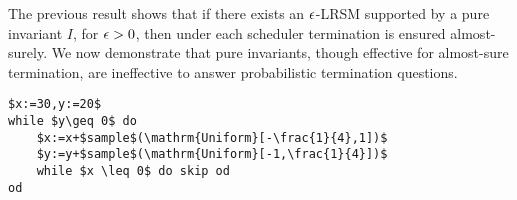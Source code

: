 The previous result shows that if there exists  an $\epsilon$-LRSM 
supported by a pure invariant $I$, for $\epsilon>0$, then under each scheduler 
termination is ensured almost-surely.
We now demonstrate that pure invariants, though effective for almost-sure 
termination, are ineffective to answer probabilistic termination questions.


\lstset{language=affprob}
\lstset{tabsize=3}
\newsavebox{\nonterm}
\begin{lrbox}{\nonterm}
\begin{lstlisting}[mathescape]
$x:=30,y:=20$
while $y\geq 0$ do
	$x:=x+$sample$(\mathrm{Uniform}[-\frac{1}{4},1])$
	$y:=y+$sample$(\mathrm{Uniform}[-1,\frac{1}{4}])$
	while $x \leq 0$ do skip od
od
\end{lstlisting}
\end{lrbox}
